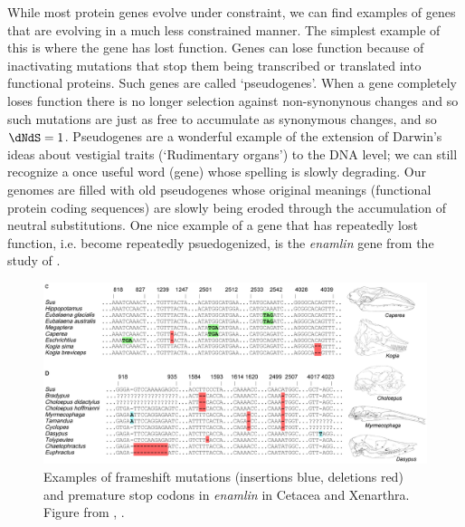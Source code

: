
While most protein genes evolve under constraint, we can find examples of
genes that are evolving in a much less constrained manner. The simplest
example of this is where the gene has lost function. Genes can lose function because of inactivating mutations that stop them being transcribed or translated into functional proteins. Such genes are called `pseudogenes'.
When a gene completely loses function there is no longer
selection against non-synonynous changes and so such mutations are just as free
to accumulate as synonymous changes, and so $\dNdS=1$.
Pseudogenes are a wonderful example of the extension of Darwin's ideas about vestigial traits (`Rudimentary organs') to the DNA level;
we can still recognize a once useful word (gene) whose spelling is slowly degrading. Our genomes are filled with old pseudogenes whose
original meanings (functional protein coding sequences) are slowly being eroded through the accumulation of neutral substitutions.
One nice example of a gene that has repeatedly lost function,
i.e. become repeatedly psuedogenized, is
the {\it enamlin} gene from the study of \citet{Meredith:09}.

\begin{figure}
\begin{center}
\includegraphics[width=\textwidth]{Journal_figs/genetic_drift/Enamelin/Enamlin.pdf}
\end{center}
\caption{Examples of frameshift mutations (insertions blue, deletions
  red) and premature stop codons in {\it enamlin} in Cetacea and
  Xenarthra. Figure from \citet{Meredith:09}, \PLOSccBY. } \label{fig:Enamlin_coding}
\end{figure}

